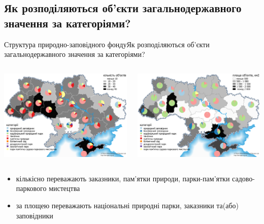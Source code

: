 \documentclass[12pt, aspectratio=1610]{beamer}
\begin{document}
\subsection{Як розподіляються об'єкти загальнодержавного значення за категоріями?}
\begin{frame}{Структура природно-заповідного фонду}{Як розподіляються об'єкти загальнодержавного значення за категоріями?}
	\begin{columns}[c]
		
		
		\includegraphics[width=\textwidth]{./figures/state_categories_count.png}%
		
		
		\includegraphics[width=\textwidth]{./figures/state_categories_area.png}
		
	\end{columns}
\begin{itemize}
	\item кількісно переважають заказники, пам'ятки природи, парки-пам'ятки садово-паркового мистецтва 
	\item за площею переважають національні природні парки, заказники та(або) заповідники
\end{itemize}
\end{frame}
\end{document}
